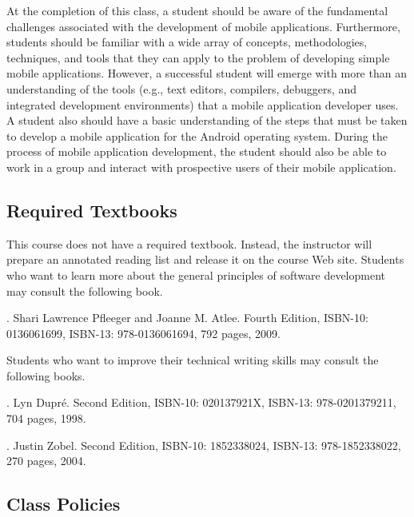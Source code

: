 At the completion of this class, a student should be aware of the fundamental challenges associated with the development 
of mobile applications.  Furthermore, students should be familiar with a wide array of concepts, methodologies, techniques, and
tools that they can apply to the problem of developing simple mobile applications.  However, a successful student will
emerge with more than an understanding of the tools (e.g., text editors, compilers, debuggers, and integrated development
environments) that a mobile application developer uses.  A student also should have a basic understanding of the steps
that must be taken to develop a mobile application for the Android operating system.  During the process of mobile
application development, the student should also be able to work in a group and interact with prospective users of their
mobile application.

\subsection*{Required Textbooks}

This course does not have a required textbook.  Instead, the instructor will prepare an annotated reading list and release it on
the course Web site. Students who want to learn more about the general principles of software development may consult the following book.


. Shari Lawrence Pfleeger and Joanne M. Atlee.
Fourth Edition, ISBN-10: 0136061699, ISBN-13: 978-0136061694, 792 pages, 2009. 

\noindent
Students who want to improve their technical writing skills may consult the following books.

. Lyn Dupr\'e. Second Edition,  ISBN-10: 020137921X,
ISBN-13: 978-0201379211, 704 pages, 1998.

.  Justin Zobel. Second Edition,  ISBN-10: 1852338024, ISBN-13:
978-1852338022, 270 pages, 2004.

\subsection*{Class Policies}

